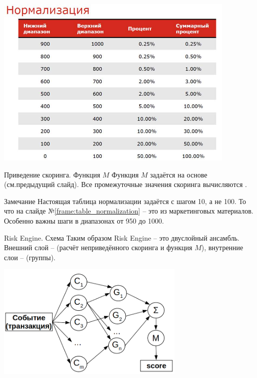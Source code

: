 \begin{frame}\label{frame:table_normalization}
	\begin{center}
		\includegraphics[width=11.5cm]{../pic/rsa_preliminary_score_normalization.png}
	\end{center}
\end{frame}

\begin{frame}{Приведение скоринга. Функция $M$}
	Функция $M$ задаётся на основе  (см.предыдущий слайд).
	Все промежуточные значения скоринга вычисляются .
	
	\begin{block}{Замечание}
		Настоящая таблица нормализации задаётся с шагом 10, а не 100. 
		То что на слайде №\ref{frame:table_normalization} -- это из маркетинговых материалов.
		Особенно важны шаги в диапазонах от 950 до 1000.
	\end{block} 
	

\end{frame}

\begin{frame}{Risk Engine. Схема}\label{frame:risk_score_sxem}
	\small
	Таким образом Risk Engine -- это двуслойный ансамбль. 
	Внешний слой --  (расчёт неприведённого скоринга и функция $M$),
	внутренние слои --  (группы).
	\begin{center}
		\includegraphics[width=9cm]{../pic/rsa_risk_score_sxem.png}
	\end{center}
\end{frame}

